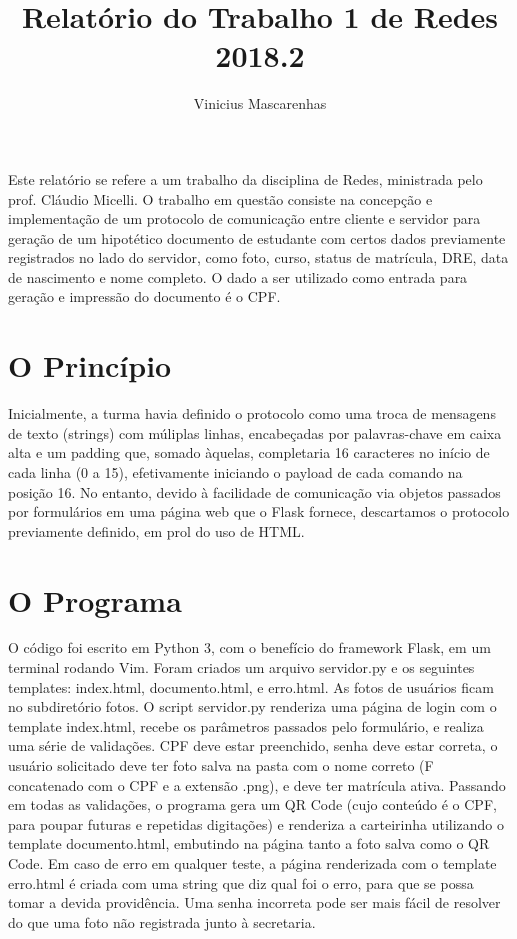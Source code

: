 \documentclass[12t]{article}
\title{Relatório do Trabalho 1 de Redes\\ 2018.2}
\author{Vinicius Mascarenhas\inst{1} }
\begin{document}
\maketitle

\begin{resumo}
	Este relatório se refere a um trabalho da disciplina de Redes, ministrada pelo prof. Cláudio Micelli. O trabalho em questão consiste na concepção e implementação de um protocolo de comunicação entre cliente e servidor para geração de um hipotético documento de estudante com certos dados previamente registrados no lado do servidor, como foto, curso, status de matrícula, DRE, data de nascimento e nome completo. O dado a ser utilizado como entrada para geração e impressão do documento é o CPF.
\end{resumo}

\section{O Princípio}
	Inicialmente, a turma havia definido o protocolo como uma troca de mensagens de texto (strings) com múliplas linhas, encabeçadas por palavras-chave em caixa alta e um padding que, somado àquelas, completaria 16 caracteres no início de cada linha (0 a 15), efetivamente iniciando o payload de cada comando na posição 16. No entanto, devido à facilidade de comunicação via objetos passados por formulários em uma página web que o Flask fornece, descartamos o protocolo previamente definido, em prol do uso de  HTML.

\section{O Programa}
	O código foi escrito em Python 3, com o benefício do framework Flask, em um terminal rodando Vim. Foram criados um arquivo servidor.py e os seguintes templates: index.html, documento.html, e erro.html. As fotos de usuários ficam no subdiretório fotos.
	O script servidor.py renderiza uma página de login com o template index.html, recebe os parâmetros passados pelo formulário, e realiza uma série de validações. CPF deve estar preenchido, senha deve estar correta, o usuário solicitado deve ter foto salva na pasta com o nome correto (F concatenado com o CPF e a extensão .png), e deve ter matrícula ativa. Passando em todas as validações, o programa gera um QR Code (cujo conteúdo é o CPF, para poupar futuras e repetidas digitações) e renderiza a carteirinha utilizando o template documento.html, embutindo na página tanto a foto salva como o QR Code.
	Em caso de erro em qualquer teste, a página renderizada com o template erro.html é criada com uma string que diz qual foi o erro, para que se possa tomar a devida providência. Uma senha incorreta pode ser mais fácil de resolver do que uma foto não registrada junto à secretaria.
\end{document}
